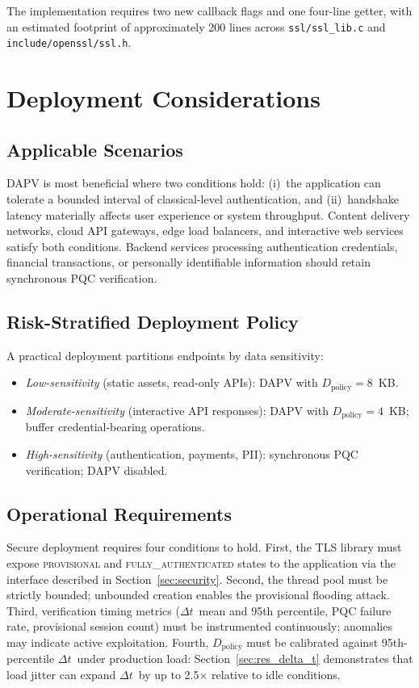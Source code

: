 \documentclass[preprint,10pt,3p]{elsarticle}
\newcommand{\Dt}{\ensuremath{\Delta t}}
\begin{document}
The implementation requires two new callback flags and one four-line getter,
with an estimated footprint of approximately 200 lines across
\texttt{ssl/ssl\_lib.c} and \texttt{include/openssl/ssl.h}.

\section{Deployment Considerations}
\label{sec:deployment}

\subsection{Applicable Scenarios}

DAPV is most beneficial where two conditions hold: (i)~the application can
tolerate a bounded interval of classical-level authentication, and (ii)~handshake
latency materially affects user experience or system throughput.  Content
delivery networks, cloud API gateways, edge load balancers, and interactive web
services satisfy both conditions.  Backend services processing authentication
credentials, financial transactions, or personally identifiable information
should retain synchronous PQC verification.

\subsection{Risk-Stratified Deployment Policy}

A practical deployment partitions endpoints by data sensitivity:
\begin{itemize}[noitemsep]
\item \textit{Low-sensitivity} (static assets, read-only APIs):
  DAPV with $D_\text{policy} = 8$~KB.
\item \textit{Moderate-sensitivity} (interactive API responses):
  DAPV with $D_\text{policy} = 4$~KB; buffer credential-bearing operations.
\item \textit{High-sensitivity} (authentication, payments, PII):
  synchronous PQC verification; DAPV disabled.
\end{itemize}

\subsection{Operational Requirements}

Secure deployment requires four conditions to hold.
First, the TLS library must expose \textsc{provisional} and
\textsc{fully\_authenticated} states to the application via the interface
described in Section~\ref{sec:security}.
Second, the thread pool must be strictly bounded; unbounded creation enables
the provisional flooding attack.
Third, verification timing metrics (\Dt\ mean and 95th percentile, PQC failure
rate, provisional session count) must be instrumented continuously;
anomalies may indicate active exploitation.
Fourth, $D_\text{policy}$ must be calibrated against 95th-percentile \Dt\
under production load: Section~\ref{sec:res_delta_t} demonstrates that load
jitter can expand \Dt\ by up to 2.5$\times$ relative to idle conditions.
\end{document}
